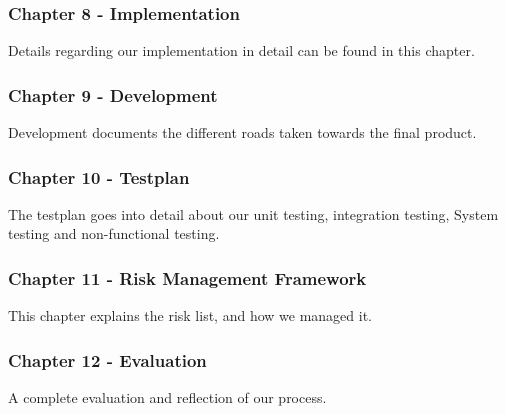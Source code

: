 \subsubsection{Chapter 8 - Implementation}
Details regarding our implementation in detail can be found in this chapter. 




\subsubsection{Chapter 9 - Development}
Development documents the different roads taken towards the final product.


\subsubsection{Chapter 10 - Testplan}
The testplan goes into detail about our unit testing, integration testing, System testing and non-functional testing.


\subsubsection{Chapter 11 - Risk Management Framework}
This chapter explains the risk list, and how we managed it. 


\subsubsection{Chapter 12 - Evaluation}
A complete evaluation and reflection of our process.